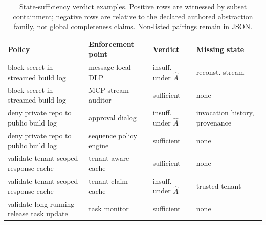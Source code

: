 \begin{table}[t]
  \caption{State-sufficiency verdict examples. Positive rows are witnessed by
  subset containment; negative rows are relative to the declared authored
  abstraction family, not global completeness claims. Non-listed pairings
  remain in JSON.}
  \label{tab:state-sufficiency}
  \centering\footnotesize
  \setlength{\tabcolsep}{2pt}
  \begin{tabular}{@{}p{}p{}p{}p{}@{}}
    \toprule
    Policy & Enforcement point & Verdict & Missing state \\
    \midrule
    block secret in streamed build log & message-local DLP & insuff. under $\widehat{A}$ & reconst. stream \\
    block secret in streamed build log & MCP stream auditor & sufficient & none \\
    deny private repo to public build log & approval dialog & insuff. under $\widehat{A}$ & invocation history, provenance \\
    deny private repo to public build log & sequence policy engine & sufficient & none \\
    validate tenant-scoped response cache & tenant-aware cache & sufficient & none \\
    validate tenant-scoped response cache & tenant-claim cache & insuff. under $\widehat{A}$ & trusted tenant \\
    validate long-running release task update & task monitor & sufficient & none \\
    \bottomrule
  \end{tabular}
\end{table}
